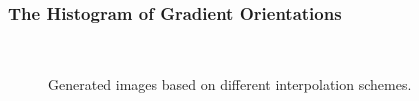 \documentclass[aspectratio=169]{beamer}
\begin{document}
\begin{frame}
\frametitle{The Histogram of Gradient Orientations}
\begin{center}
\begin{figure}[h!]
\centering
\setlength\fboxsep{0pt}
\setlength\fboxrule{0.5pt}
\\
\caption[Signal Plotting: Interpolation]{Generated images based on different interpolation schemes.}
\label{fig:interpolation}
\end{figure}
\end{center}
\end{frame}
\end{document}
